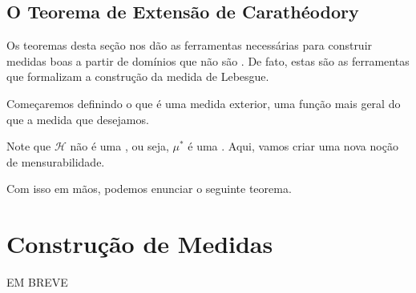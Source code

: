 \measureCompletion
\subsection*{O Teorema de Extensão de Carathéodory}
Os teoremas desta seção nos dão as ferramentas necessárias para construir medidas boas a partir de domínios que não são \sigmaAlgs. De fato, estas são as ferramentas que formalizam a construção da medida de Lebesgue.

Começaremos definindo o que é uma medida exterior, uma função mais geral do que a medida que desejamos.

\outerMeasure

Note que $\mathcal{H}$ não é uma \sigmaAlg, ou seja, $\mu^{*}$ é uma . Aqui, vamos criar uma nova noção de mensurabilidade.

\measurableInOuterMeasure

Com isso em mãos, podemos enunciar o seguinte teorema.

\caratheodory














\section{Construção de Medidas}
EM BREVE